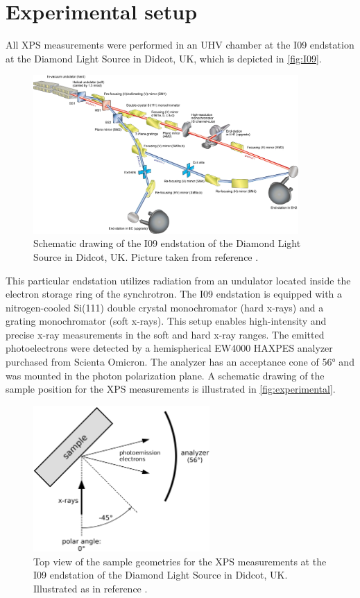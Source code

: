 \newpage
\section{Experimental setup}

All \ac{XPS} measurements were performed in an \ac{UHV} chamber at the I09 endstation at the Diamond Light Source in Didcot, UK, which is depicted in \autoref{fig:I09}.

\begin{figure}[htbp]
	\centering
	\includegraphics[width=0.9\textwidth]{images/I09.jpg}
	\caption{Schematic drawing of the I09 endstation of the Diamond Light Source in Didcot, UK. Picture taken from reference \cite{Diamond2025}.}
	\label{fig:I09}
\end{figure}

 This particular endstation utilizes radiation from an undulator located inside the electron storage ring of the synchrotron. The I09 endstation is equipped with a nitrogen-cooled Si(111) double crystal monochromator (hard x-rays) and a grating monochromator (soft x-rays). This setup enables high-intensity and precise x-ray measurements in the soft and hard x-ray ranges. The emitted photoelectrons were detected by a hemispherical EW4000 HAXPES analyzer purchased from Scienta Omicron. The analyzer has an acceptance cone of 56\si{\degree} and was mounted in the photon polarization plane.\autocite{Diamond2025} A schematic drawing of the sample position for the \ac{XPS} measurements is illustrated in \autoref{fig:experimental}.

\begin{figure}[htbp]
	\centering
	\includegraphics[width=0.6\textwidth]{images/experimental.png}
	\caption{Top view of the sample geometries for the \ac{XPS} measurements at the I09 endstation of the Diamond Light Source in Didcot, UK. Illustrated as in reference \cite{Kny2025}.}
	\label{fig:experimental}
\end{figure}

